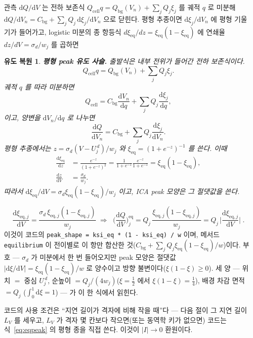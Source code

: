 \documentclass[11pt,a4paper]{article}
\newtheorem*{derivebox}{유도 복원}
\newcommand{\dd}{\mathrm{d}}
\newcommand{\eq}{\mathrm{eq}}
\newcommand{\cell}{\mathrm{cell}}
\newcommand{\bg}{\mathrm{bg}}
\newcommand{\code}[1]{\texttt{#1}}
\begin{document}
관측 $\dd Q/\dd V$ 는 전하 보존식 $Q_\cell q=Q_\bg(V_n)+\sum_jQ_j\xi_j$ 를 궤적 $q$ 로 미분해
$\dd Q/\dd V_n=C_\bg+\sum_jQ_j\,\dd\xi_j/\dd V_n$ 으로 닫힌다. 평형 추종이면 $\dd\xi_j/\dd V_n$ 에 평형 기울기가 들어가고,
logistic 미분의 종 항등식 $d\xi_\eq/dz=\xi_\eq(1-\xi_\eq)$ 에 연쇄율 $dz/dV=\sigma_d/w_j$ 를 곱하면
\begin{derivebox}
\textbf{평형 peak 유도 사슬.} 출발식은 내부 전위가 들어간 전하 보존식이다.
\begin{equation*}
Q_\cell q=Q_\bg(V_n)+\sum_jQ_j\xi_j .
\end{equation*}
궤적 $q$ 를 따라 미분하면
\begin{equation*}
Q_\cell=C_\bg\frac{\dd V_n}{\dd q}+\sum_jQ_j\frac{\dd\xi_j}{\dd q},
\end{equation*}
이고, 양변을 $\dd V_n/\dd q$ 로 나누면
\begin{equation*}
\frac{\dd Q}{\dd V_n}=C_\bg+\sum_jQ_j\frac{\dd\xi_j}{\dd V_n}.
\end{equation*}
평형 추종에서는 $z=\sigma_d(V-U_j^{\,d})/w_j$ 와
$\xi_\eq=(1+e^{-z})^{-1}$ 를 쓴다. 이때
\begin{align*}
\frac{\dd\xi_\eq}{\dd z}
&=\frac{e^{-z}}{(1+e^{-z})^2}
=\frac{1}{1+e^{-z}}\frac{e^{-z}}{1+e^{-z}}
=\xi_\eq(1-\xi_\eq),\\
\frac{\dd z}{\dd V}&=\frac{\sigma_d}{w_j}.
\end{align*}
따라서 $\dd\xi_\eq/\dd V=\sigma_d\xi_\eq(1-\xi_\eq)/w_j$ 이고, ICA peak 모양은 그 절댓값을 쓴다.
\end{derivebox}
\begin{equation}
\frac{\dd\xi_{\eq,j}}{\dd V}=\frac{\sigma_d\,\xi_{\eq,j}(1-\xi_{\eq,j})}{w_j}
\;\Longrightarrow\;
\boxed{\;\Big(\frac{\dd Q}{\dd V}\Big)^\eq_j
=Q_j\,\frac{\xi_{\eq,j}(1-\xi_{\eq,j})}{w_j}
=Q_j\,\Big|\frac{\dd\xi_{\eq,j}}{\dd V}\Big|\;.}
\label{eq:eqpeak}
\end{equation}
이것이 코드의 \code{peak\_shape = ksi\_eq * (1 - ksi\_eq) / w} 이며, 메서드 \code{equilibrium} 이 전이별로 이 항만
합산한 것($C_\bg+\sum_jQ_j\xi_\eq(1-\xi_\eq)/w$)이다. 부호 — $\sigma_d$ 가 미분에서 한 번 들어오지만 peak 모양은
절댓값 $|\dd\xi/\dd V|=\xi_\eq(1-\xi_\eq)/w$ 로 양수이고 방향 불변이다($\xi(1-\xi)\ge0$). 세 양 — 위치 $=$ 중심
$U_j^{\,d}$, 순높이 $=Q_j/(4w_j)$($\xi=\tfrac12$ 에서 $\xi(1-\xi)=\tfrac14$), 배경 차감 면적 $=Q_j$
($\int_0^1\dd\xi=1$) — 가 이 한 식에서 읽힌다.

코드의 사용 조건은 ``지연 길이가 격자에 비해 작을 때''다 — 다음 절이 그 지연 길이 $L_V$ 를 세우고, $L_V$ 가 격자
몇 칸보다 작으면(또는 동역학 키가 없으면) 코드는 식~\eqref{eq:eqpeak} 의 평형 종을 직접 쓴다. 이것이 $|I|\to0$ 환원이다.
\end{document}
